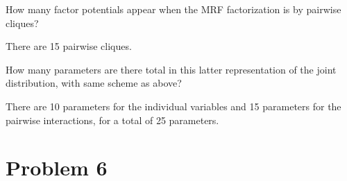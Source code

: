 \documentclass[letterpaper]{article}
\begin{document}
\begin{enumerate}[a)]
  \ii How many factor potentials appear when the MRF factorization is by pairwise cliques?
  \begin{answer*}
    There are 15 pairwise cliques.
  \end{answer*}

  \ii How many parameters are there total in this latter representation of the joint distribution, with same scheme as above?
  \begin{answer*}
    There are 10 parameters for the individual variables and 15 parameters for the pairwise interactions, for a total of 25 parameters.
  \end{answer*}

\end{enumerate}
\newpage
\section*{Problem 6}
\end{document}
